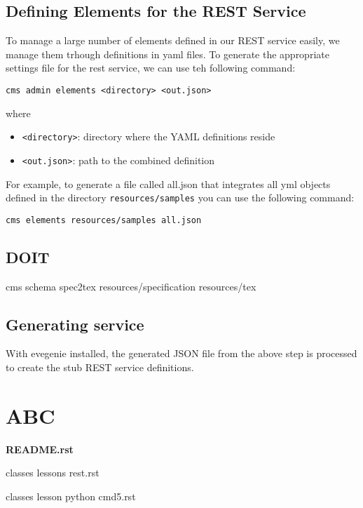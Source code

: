 \documentclass[9pt,twocolumn,twoside]{styles/osajnl}
\begin{document}
\subsection{Defining Elements for the REST Service}

To manage a large number of elements defined in our REST service
easily, we manage them trhough definitions in yaml files. To generate
the appropriate settings file for the rest service, we can use teh
following command:

\begin{verbatim}
cms admin elements <directory> <out.json>
\end{verbatim}

where

\begin{itemize}
\item \verb+<directory>+: directory where the YAML definitions reside
\item \verb+<out.json>+: path to the combined definition
\end{itemize}

For example, to generate a file called all.json that integrates all
yml objects defined in the directory \verb+resources/samples+ you can
use the following command:

\begin{verbatim}
cms elements resources/samples all.json
\end{verbatim}

\subsection{DOIT}


cms schema spec2tex resources/specification resources/tex

\subsection{Generating service}

With evegenie installed, the generated JSON file from the above step
is processed to create the stub REST service definitions.


\section{ABC}
{\bf README.rst}

classes lessons rest.rst

classes lesson python cmd5.rst

\end{document}
